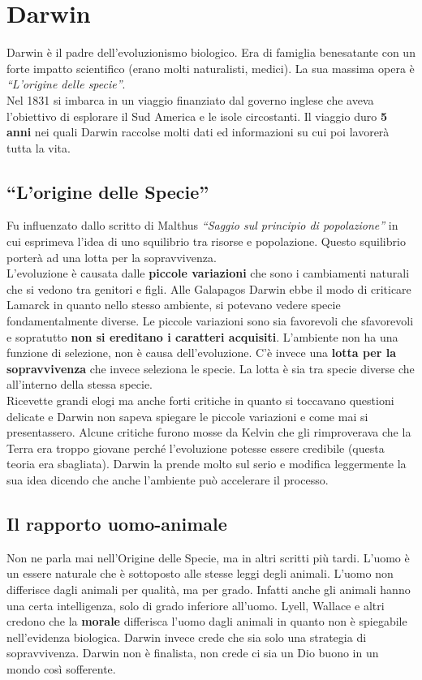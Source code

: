 
\section{Darwin}
Darwin è il padre dell'evoluzionismo biologico. Era di famiglia benesatante con un forte impatto
scientifico (erano molti naturalisti, medici). La sua massima opera è \textit{``L'origine delle 
specie''}.\\
Nel 1831 si imbarca in un viaggio finanziato dal governo inglese che aveva l'obiettivo di esplorare
il Sud America e le isole circostanti. Il viaggio duro \textbf{5 anni} nei quali Darwin raccolse 
molti dati ed informazioni su cui poi lavorerà tutta la vita.

\subsection{``L'origine delle Specie''}
Fu influenzato dallo scritto di Malthus \textit{``Saggio sul principio di popolazione''} in cui 
esprimeva l'idea di uno squilibrio tra risorse e popolazione. Questo squilibrio porterà ad una lotta
per la sopravvivenza.\\
L'evoluzione è causata dalle \textbf{piccole variazioni} che sono i cambiamenti naturali che si 
vedono tra genitori e figli. Alle Galapagos Darwin ebbe il modo di criticare Lamarck in quanto nello
stesso ambiente, si potevano vedere specie fondamentalmente diverse. Le piccole variazioni sono sia 
favorevoli che sfavorevoli e sopratutto \textbf{non si ereditano i caratteri acquisiti}. L'ambiente
non ha una funzione di selezione, non è causa dell'evoluzione. C'è invece una \textbf{lotta per la
sopravvivenza} che invece seleziona le specie. La lotta è sia tra specie diverse che all'interno 
della stessa specie.\\ [\baselineskip]
Ricevette grandi elogi ma anche forti critiche in quanto si toccavano questioni delicate e Darwin
non sapeva spiegare le piccole variazioni e come mai si presentassero. Alcune critiche furono mosse
da Kelvin che gli rimproverava che la Terra era troppo giovane perché l'evoluzione potesse essere
credibile (questa teoria era sbagliata). Darwin la prende molto sul serio e modifica leggermente la 
sua idea dicendo che anche l'ambiente può accelerare il processo.

\subsection{Il rapporto uomo-animale}
Non ne parla mai nell'Origine delle Specie, ma in altri scritti più tardi. L'uomo è un essere 
naturale che è sottoposto alle stesse leggi degli animali. L'uomo non differisce dagli animali per
qualità, ma per grado. Infatti anche gli animali hanno una certa intelligenza, solo di grado 
inferiore all'uomo. Lyell, Wallace e altri credono che la \textbf{morale} differisca l'uomo dagli 
animali in quanto non è spiegabile nell'evidenza biologica. Darwin invece crede che sia solo una
strategia di sopravvivenza. Darwin non è finalista, non crede ci sia un Dio buono in un mondo così
sofferente.
